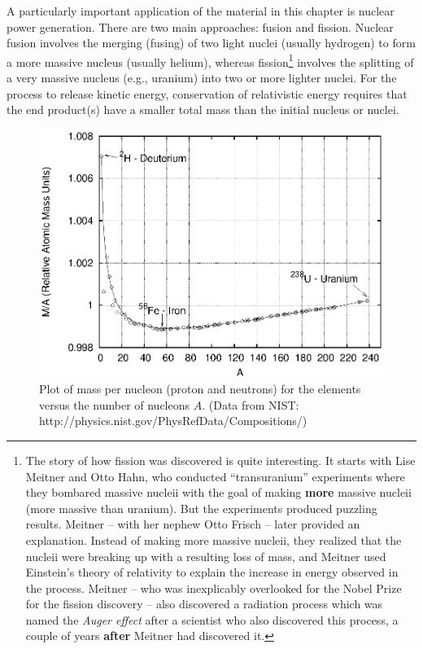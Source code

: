 A particularly important application of the material in this chapter
is nuclear power generation.  There are two main approaches: fusion
and fission.  Nuclear fusion involves the merging (fusing) of two
light nuclei (usually hydrogen) to form a more massive nucleus
(usually helium), whereas fission\footnote{The story of how fission was
discovered is quite interesting. It starts with Lise Meitner and Otto
Hahn, who conducted ``transuranium'' experiments where they bombared 
massive nucleii with the goal of making {\bf more} massive nucleii
(more massive than uranium). But the experiments produced puzzling results.
Meitner -- with her nephew Otto Frisch -- later provided an explanation.
Instead of making more massive nucleii, they realized that the nucleii
were breaking up with a resulting loss of mass, and Meitner used 
Einstein's theory of relativity
to explain the increase in energy observed in the process. Meitner -- who
was inexplicably overlooked for the Nobel Prize for the fission discovery --
also discovered a radiation process which was named the {\em Auger effect}
after a scientist who also discovered this process, a couple of years
{\bf after} Meitner had discovered it.}
 involves the splitting of a very
massive nucleus (e.g., uranium) into two or more lighter nuclei.
For the process to release kinetic energy, conservation of
relativistic energy requires that the end product(s) have a smaller
total mass than the initial nucleus or nuclei.

\begin{figure}[tbp]
\begin{center}
\includegraphics[width=4.5in]{relativity_conservation/mass_per_nucleon.eps}
\end{center}
\caption{Plot of mass per nucleon (proton and neutrons) for the 
elements versus the number of nucleons $A$. (Data from NIST:
http://physics.nist.gov/PhysRefData/Compositions/)}
\label{fig:mass_per_nucleon}
\end{figure}

